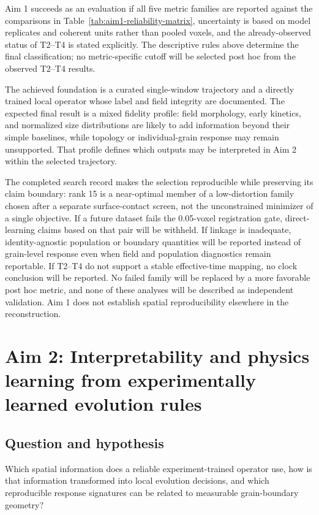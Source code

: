 \documentclass[proposalMode]{ufdissertation}
\begin{document}
Aim 1 succeeds as an evaluation if all five metric families are reported against the comparisons in Table~\ref{tab:aim1-reliability-matrix}, uncertainty is based on model replicates and coherent units rather than pooled voxels, and the already-observed status of T2--T4 is stated explicitly. The descriptive rules above determine the final classification; no metric-specific cutoff will be selected post hoc from the observed T2--T4 results.

The achieved foundation is a curated single-window trajectory and a directly trained local operator whose label and field integrity are documented. The expected final result is a mixed fidelity profile: field morphology, early kinetics, and normalized size distributions are likely to add information beyond their simple baselines, while topology or individual-grain response may remain unsupported. That profile defines which outputs may be interpreted in Aim 2 within the selected trajectory.

The completed search record makes the selection reproducible while preserving its claim boundary: rank 15 is a near-optimal member of a low-distortion family chosen after a separate surface-contact screen, not the unconstrained minimizer of a single objective. If a future dataset fails the 0.05-voxel registration gate, direct-learning claims based on that pair will be withheld. If linkage is inadequate, identity-agnostic population or boundary quantities will be reported instead of grain-level response even when field and population diagnostics remain reportable. If T2--T4 do not support a stable effective-time mapping, no clock conclusion will be reported. No failed family will be replaced by a more favorable post hoc metric, and none of these analyses will be described as independent validation. Aim 1 does not establish spatial reproducibility elsewhere in the reconstruction.


\section{Aim 2: Interpretability and physics learning from experimentally learned evolution rules}

\subsection{Question and hypothesis}

Which spatial information does a reliable experiment-trained operator use, how is that information transformed into local evolution decisions, and which reproducible response signatures can be related to measurable grain-boundary geometry?
\end{document}
